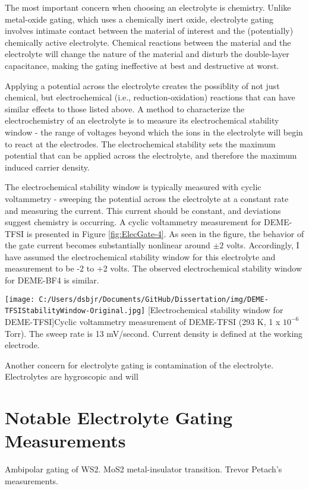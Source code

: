 The most important concern when choosing an electrolyte is chemistry. Unlike metal-oxide gating, which uses a chemically inert oxide, electrolyte gating involves intimate contact between the material of interest and the (potentially) chemically active electrolyte. Chemical reactions between the material and the electrolyte will change the nature of the material and disturb the double-layer capacitance, making the gating ineffective at best and destructive at worst. 

Applying a potential across the electrolyte creates the possiblity of not just chemical, but electrochemical (i.e., reduction-oxidation) reactions that can have similar effects to those listed above. A method to characterize the electrochemistry of an electrolyte is to measure its electrochemical stability window - the range of voltages beyond which the ions in the electrolyte will begin to react at the electrodes. The electrochemical stability sets the maximum potential that can be applied across the electrolyte, and therefore the maximum induced carrier density.

The electrochemical stability window is typically measured with cyclic voltammetry - sweeping the potential across the electrolyte at a constant rate and measuring the current. This current should be constant, and deviations suggest chemistry is occurring. A cyclic voltammetry measurement for DEME-TFSI is presented in Figure \ref{fig:ElecGate-4}. As seen in the figure, the behavior of the gate current becomes substantially nonlinear around $\pm 2$ volts. Accordingly, I have assumed the electrochemical stability window for this electrolyte and  measurement to be -2 to +2 volts. The observed electrochemical stability window for DEME-BF4 is similar.

\begin{centering}
\texttt{[image: C:/Users/dsbjr/Documents/GitHub/Dissertation/img/DEME-TFSIStabilityWindow-Original.jpg]}
  \captionsetup{width=0.75\textwidth}
  [Electrochemical stability window for DEME-TFSI]{Cyclic voltammetry measurement of DEME-TFSI (293 K, 1 x $10^{-6}$ Torr). The sweep rate is 13 mV/second. Current density is defined at the working electrode.} 
  \label{fig:ElecGate-4}
\end{centering}

Another concern for electrolyte gating is contamination of the electrolyte. Electrolytes are hygroscopic and will 


\section{Notable Electrolyte Gating Measurements}

Ambipolar gating of WS2. MoS2 metal-insulator transition. Trevor Petach's measurements.